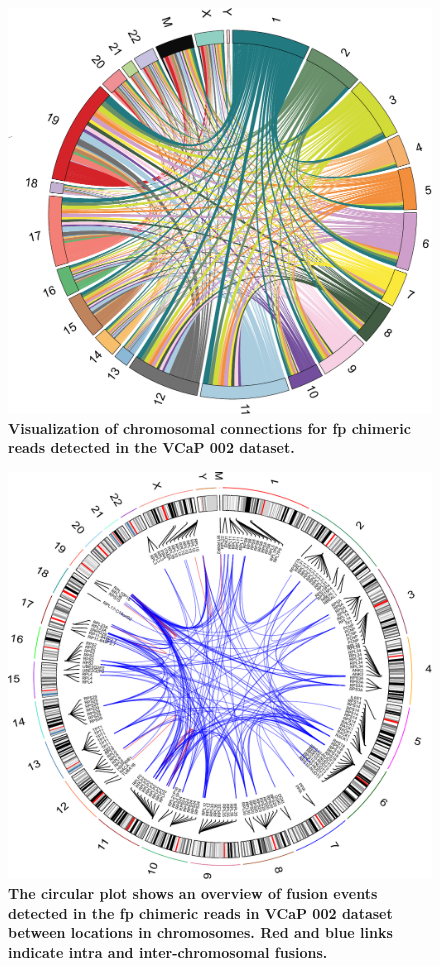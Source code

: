 \documentclass[pdflatex, sn-mathphys-num, lineno]{sn-jnl}%
\theoremstyle{thmstyleone}%
\theoremstyle{thmstyletwo}%
\theoremstyle{thmstylethree}%
\begin{document}
\begin{figure}[!h]
	\includegraphics[height=0.9\columnwidth]{finals/sf2}
	\caption{ {\bf  Visualization of chromosomal connections for \gls{fp} chimeric reads detected in the VCaP 002 dataset. }}
	\label{fig:sf2}
\end{figure}



\begin{figure}[!h]
	\includegraphics[height=0.97\columnwidth]{finals/sf3}
	\caption{ {\bf  The circular plot shows an overview of fusion events detected in the \gls{fp} chimeric reads in VCaP 002 dataset between locations in chromosomes. Red and blue links indicate intra and inter-chromosomal fusions. }}
	\label{fig:sf2}
\end{figure}
\end{document}
